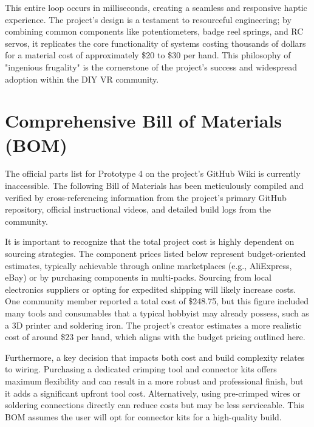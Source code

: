 \documentclass{article}
\begin{document}
This entire loop occurs in milliseconds, creating a seamless and responsive haptic experience. The project's design is a testament to resourceful engineering; by combining common components like potentiometers, badge reel springs, and RC servos, it replicates the core functionality of systems costing thousands of dollars for a material cost of approximately \$20 to \$30 per hand. This philosophy of "ingenious frugality" is the cornerstone of the project's success and widespread adoption within the DIY VR community.

\newpage
\section{Comprehensive Bill of Materials (BOM)}
The official parts list for Prototype 4 on the project's GitHub Wiki is currently inaccessible. The following Bill of Materials has been meticulously compiled and verified by cross-referencing information from the project's primary GitHub repository, official instructional videos, and detailed build logs from the community.

It is important to recognize that the total project cost is highly dependent on sourcing strategies. The component prices listed below represent budget-oriented estimates, typically achievable through online marketplaces (e.g., AliExpress, eBay) or by purchasing components in multi-packs. Sourcing from local electronics suppliers or opting for expedited shipping will likely increase costs. One community member reported a total cost of \$248.75, but this figure included many tools and consumables that a typical hobbyist may already possess, such as a 3D printer and soldering iron. The project's creator estimates a more realistic cost of around \$23 per hand, which aligns with the budget pricing outlined here.

Furthermore, a key decision that impacts both cost and build complexity relates to wiring. Purchasing a dedicated crimping tool and connector kits offers maximum flexibility and can result in a more robust and professional finish, but it adds a significant upfront tool cost. Alternatively, using pre-crimped wires or soldering connections directly can reduce costs but may be less serviceable. This BOM assumes the user will opt for connector kits for a high-quality build.
\end{document}
